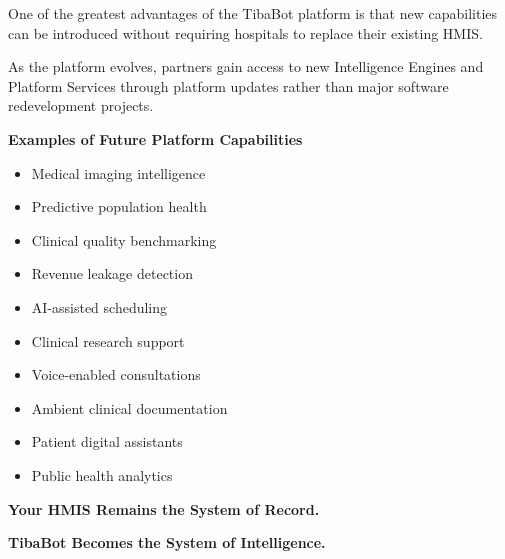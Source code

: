 One of the greatest advantages of the TibaBot platform is that new capabilities can be introduced without requiring hospitals to replace their existing HMIS.

As the platform evolves, partners gain access to new Intelligence Engines and Platform Services through platform updates rather than major software redevelopment projects.

\vspace{5mm}

\begin{infobox}

\textbf{Examples of Future Platform Capabilities}

\vspace{2mm}

\begin{itemize}

\item Medical imaging intelligence

\item Predictive population health

\item Clinical quality benchmarking

\item Revenue leakage detection

\item AI-assisted scheduling

\item Clinical research support

\item Voice-enabled consultations

\item Ambient clinical documentation

\item Patient digital assistants

\item Public health analytics

\end{itemize}

\end{infobox}


\begin{callout}

\centering

\Huge

\textbf{Your HMIS Remains the System of Record.}

\vspace{4mm}

\Huge

\textbf{TibaBot Becomes the System of Intelligence.}

\end{callout}
